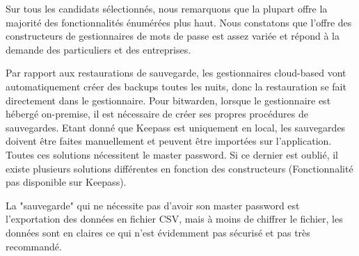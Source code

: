 Sur tous les candidats sélectionnés, nous remarquons que la plupart offre la majorité des fonctionnalités énumérées plus haut. Nous constatons que l'offre des constructeurs de gestionnaires de mots de passe est assez variée et répond à la demande des particuliers et des entreprises.

Par rapport aux restaurations de sauvegarde, les gestionnaires cloud-based vont automatiquement créer des backups toutes les nuits, donc la restauration se fait directement dans le gestionnaire. Pour bitwarden, lorsque le gestionnaire est hébergé on-premise, il est nécessaire de créer ses propres procédures de sauvegardes. Etant donné que Keepass est uniquement en local, les sauvegardes doivent être faites manuellement et peuvent être importées sur l'application. Toutes ces solutions nécessitent le master password. Si ce dernier est oublié, il existe plusieurs solutions différentes en fonction des constructeurs (Fonctionnalité pas disponible sur Keepass). 

La "sauvegarde" qui ne nécessite pas d'avoir son master password est l'exportation des données en fichier CSV, mais à moins de chiffrer le fichier, les données sont en claires ce qui n'est évidemment pas sécurisé et pas très recommandé.
